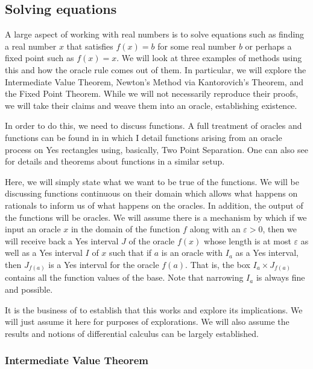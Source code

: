 \documentclass[12pt]{article}
\begin{document}
\subsection{Solving equations}

A large aspect of working with real numbers is to solve equations such as finding a real number $x$ that satisfies $f(x) = b$ for some real number $b$ or perhaps a fixed point such as $f(x) = x$. We will look at three examples of methods using this and how the oracle rule comes out of them. In particular, we will explore the Intermediate Value Theorem, Newton's Method via Kantorovich's Theorem, and the Fixed Point Theorem. While we will not necessarily reproduce their proofs, we will take their claims and weave them into an oracle, establishing existence. 

In order to do this, we need to discuss functions. A full treatment of oracles and functions can be found in \cite{taylor23funora} in which I detail functions arising from an oracle process on Yes rectangles using, basically, Two Point Separation. One can also see \cite{bridger} for details and theorems about functions in a similar setup. 

Here, we will simply state what we want to be true of the functions. We will be discussing functions continuous on their domain which allows what happens on rationals to inform us of what happens on the oracles. In addition, the output of the functions will be oracles. We will assume there is a mechanism by which if we input an oracle $x$ in the domain of the function $f$ along with an $\varepsilon > 0$, then we will receive back a Yes interval $J$ of the oracle $f(x)$ whose length is at most $\varepsilon$ as well as a Yes interval $I$ of $x$ such that if $a$ is an oracle with $I_a$ as a Yes interval, then $J_{f(a)}$ is a Yes interval for the oracle $f(a)$. That is, the box $I_a \times J_{f(a)}$ contains all the function values of the base. Note that narrowing $I_a$ is always fine and possible. 

It is the business of \cite{taylor23funora} to establish that this works and explore its implications. We will just assume it here for purposes of explorations. We will also assume the results and notions of differential calculus can be largely established.  



\subsubsection{Intermediate Value Theorem}\label{sec:ivt}
\end{document}
